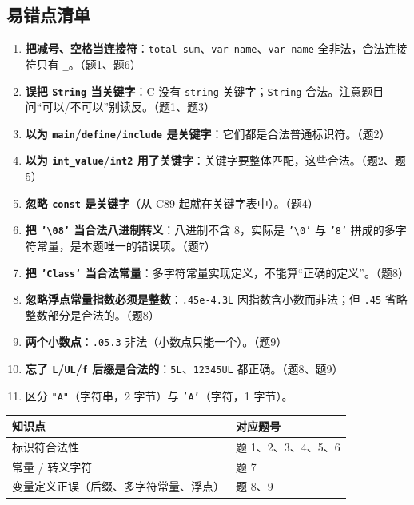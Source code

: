 \documentclass[UTF8,zihao=-4,a4paper]{ctexart}
\begin{document}
\subsection{易错点清单}
\begin{yicuodian}
\begin{enumerate}
  \item \textbf{把减号、空格当连接符}：\texttt{total-sum}、\texttt{var-name}、\texttt{var name} 全非法，合法连接符只有 \texttt{\_}。（题1、题6）
  \item \textbf{误把 \texttt{String} 当关键字}：C 没有 \texttt{string} 关键字；\texttt{String} 合法。注意题目问“可以/不可以”别读反。（题1、题3）
  \item \textbf{以为 \texttt{main}/\texttt{define}/\texttt{include} 是关键字}：它们都是合法普通标识符。（题2）
  \item \textbf{以为 \texttt{int\_value}/\texttt{int2} 用了关键字}：关键字要整体匹配，这些合法。（题2、题5）
  \item \textbf{忽略 \texttt{const} 是关键字}（从 C89 起就在关键字表中）。（题4）
  \item \textbf{把 \texttt{'\textbackslash 08'} 当合法八进制转义}：八进制不含 8，实际是 \texttt{'\textbackslash 0'} 与 \texttt{'8'} 拼成的多字符常量，是本题唯一的错误项。（题7）
  \item \textbf{把 \texttt{'Class'} 当合法常量}：多字符常量实现定义，不能算“正确的定义”。（题8）
  \item \textbf{忽略浮点常量指数必须是整数}：\texttt{.45e-4.3L} 因指数含小数而非法；但 \texttt{.45} 省略整数部分是合法的。（题8）
  \item \textbf{两个小数点}：\texttt{.05.3} 非法（小数点只能一个）。（题9）
  \item \textbf{忘了 \texttt{L}/\texttt{UL}/\texttt{f} 后缀是合法的}：\texttt{5L}、\texttt{12345UL} 都正确。（题8、题9）
  \item 区分 \texttt{"A"}（字符串，2 字节）与 \texttt{'A'}（字符，1 字节）。
\end{enumerate}
\end{yicuodian}

\begin{tipbox}[自测指路 · 第 1 章]
\begin{tabularx}{\linewidth}{p{4.6cm} X}
\toprule
知识点 & 对应题号\\
\midrule
标识符合法性 & 题 1、2、3、4、5、6\\
常量 / 转义字符 & 题 7\\
变量定义正误（后缀、多字符常量、浮点） & 题 8、9\\
\bottomrule
\end{tabularx}
\end{tipbox}
\end{document}
